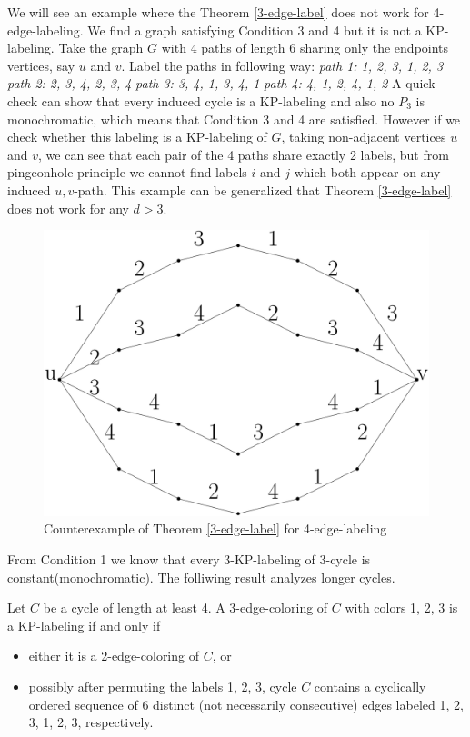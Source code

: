 \documentclass[12pt,a4paper,titlepage,openany]{report}
\begin{document}
\begin{example}
We will see an example where the Theorem \ref{3-edge-label} does not work for 4-edge-labeling. We find a graph satisfying Condition 3 and 4 but it is not a KP-labeling.\newline
Take the graph $G$ with 4 paths of length 6 sharing only the endpoints vertices, say $u$ and $v$. Label the paths in following way:\newline
\textit{path 1: 1, 2, 3, 1, 2, 3}\newline
\textit{path 2: 2, 3, 4, 2, 3, 4}\newline
\textit{path 3: 3, 4, 1, 3, 4, 1}\newline
\textit{path 4: 4, 1, 2, 4, 1, 2}\newline
A quick check can show that every induced cycle is a KP-labeling and also no $P_3$ is monochromatic, which means that Condition 3 and 4 are satisfied. However if we check whether this labeling is a KP-labeling of $G$, taking non-adjacent vertices $u$ and $v$, we can see that each pair of the 4 paths share exactly 2 labels, but from pingeonhole principle we cannot find labels $i$ and $j$ which both appear on any induced $u, v$-path.\newline
This example can be generalized that Theorem \ref{3-edge-label} does not work for any $d>3$.  
\begin{figure}[h]
\begin{center}
\includegraphics[width=0.6\linewidth]{figures/d4.png}
\end{center}
\caption{Counterexample of Theorem \ref{3-edge-label} for 4-edge-labeling}
\end{figure}
\end{example}
From Condition 1 we know that every 3-KP-labeling of 3-cycle is constant(monochromatic). The folliwing result analyzes longer cycles.
\begin{lemma}
Let $C$ be a cycle of length at least 4. A 3-edge-coloring of $C$ with colors 1, 2, 3 is a KP-labeling if and only if
\begin{itemize}
\item either it is a 2-edge-coloring of $C$, or
\item possibly after permuting the labels 1, 2, 3, cycle $C$ contains a cyclically ordered sequence
of 6 distinct (not necessarily consecutive) edges labeled 1, 2, 3, 1, 2, 3, respectively. 
\end{itemize}
\end{lemma}
\end{document}
